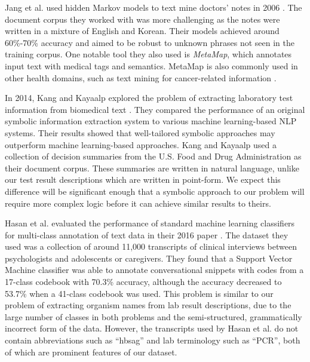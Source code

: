 \documentclass[12pt]{article}
\begin{document}
Jang et al. used hidden Markov models to text mine doctors' notes in 2006 \cite{text_mining_for_medical}. The document corpus they worked with was more challenging as the notes were written in a mixture of English and Korean. Their models achieved around 60\%-70\% accuracy and aimed to be robust to unknown phrases not seen in the training corpus. One notable tool they also used is \textit{MetaMap}, which annotates input text with medical tags and semantics. MetaMap is also commonly used in other health domains, such as text mining for cancer-related information \cite{text_mining_of_cancer-related}.

In 2014, Kang and Kayaalp explored the problem of extracting laboratory test information from biomedical text \cite{extracting_laboratory_test_information}. They compared the performance of an original symbolic information extraction system to various machine learning-based NLP systems. Their results showed that well-tailored symbolic approaches may outperform machine learning-based approaches. Kang and Kayaalp used a collection of decision summaries from the U.S. Food and Drug Administration as their document corpus. These summaries are written in natural language, unlike our test result descriptions which are written in point-form. We expect this difference will be significant enough that a symbolic approach to our problem will require more complex logic before it can achieve similar results to theirs.

Hasan et al. evaluated the performance of standard machine learning classifiers for multi-class annotation of text data in their 2016 paper \cite{a_study_of_the}. The dataset they used was a collection of around 11,000 transcripts of clinical interviews between psychologists and adolescents or caregivers. They found that a Support Vector Machine classifier was able to annotate conversational snippets with codes from a 17-class codebook with 70.3\% accuracy, although the accuracy decreased to 53.7\% when a 41-class codebook was used. This problem is similar to our problem of extracting organism names from lab result descriptions, due to the large number of classes in both problems and the semi-structured, grammatically incorrect form of the data. However, the transcripts used by Hasan et al. do not contain abbreviations such as ``hbsag'' and lab terminology such as ``PCR'', both of which are prominent features of our dataset.
\end{document}
